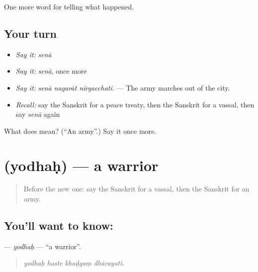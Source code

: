 \begin{grammarlens}[title={What you've built}]
One more word for telling what happened.
\end{grammarlens}

\subsection*{Your turn}
\begin{itemize}
\raggedright
  \item \emph{Say it:} \emph{senā}
  \item \emph{Say it:} \emph{senā}, once more
  \item \emph{Say it:} \emph{senā nagarāt nirgacchati.} — The army marches out of the city.
  \item \emph{Recall:} say the Sanskrit for a peace treaty, then the Sanskrit for a vassal, then say \emph{senā} again
\end{itemize}

\begin{tcolorbox}[breakable,colback=teal!4,colframe=teal!35!black,title={Before you move on}]
What does  mean? (\textquotedblleft{}An army\textquotedblright{}.) Say it once more.
\end{tcolorbox}
\section[\texorpdfstring{\sk{योधः} (yodhaḥ)}{योधः (yodhaḥ)}]{ (yodhaḥ) — a warrior}

\label{lesson:SA-C318-yodhah}



\begin{quote}
Before the new one: say the Sanskrit for a vassal, then the Sanskrit for an army.
\end{quote}

\subsection*{You'll want to know: }
\textbf{} — \emph{yodhaḥ} — \textquotedblleft{}a warrior\textquotedblright{}.

\begin{quote}
   
\end{quote}

\begin{quote}
\emph{yodhaḥ haste khaḍgaṃ dhārayati.}
\end{quote}

